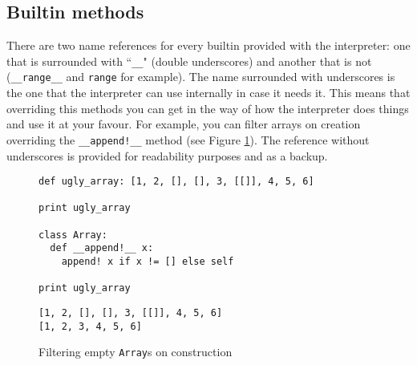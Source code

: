 \documentclass[a4paper,11pt]{article}
\begin{document}
\subsection{Builtin methods}
There are two name references for every builtin provided with the interpreter: one that is
  surrounded with ``\texttt{\_\_}" (double underscores) and another that is not (\texttt{\_\_range\_\_} and \texttt{range} for example).
  The name surrounded with underscores is the one that the interpreter can use internally in case it needs it.
  This means that overriding this methods you can get in the way of how the interpreter does things and use it
  at your favour. For example, you can filter arrays on creation overriding the \texttt{\_\_append!\_\_} method (see Figure
  \ref{override_append}). The reference without underscores is provided for readability purposes and as a backup.
\begin{figure}[h!]
\begin{lstlisting}[language=hal]
def ugly_array: [1, 2, [], [], 3, [[]], 4, 5, 6]

print ugly_array

class Array:
  def __append!__ x:
    append! x if x != [] else self

print ugly_array
\end{lstlisting}
\begin{lstlisting}[language=output]
[1, 2, [], [], 3, [[]], 4, 5, 6]
[1, 2, 3, 4, 5, 6]
\end{lstlisting}
\caption{Filtering empty \texttt{Array}s on construction}
\label{override_append}
\end{figure}
\end{document}
